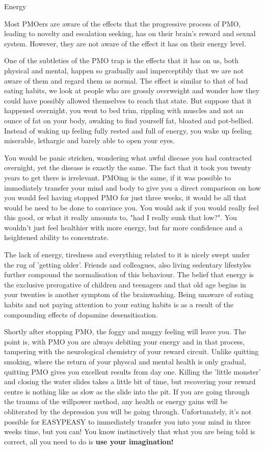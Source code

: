 Energy

Most PMOers are aware of the effects that the progressive process of PMO, leading to novelty and escalation seeking, has on their brain's reward and sexual system. However, they are not aware of the effect it has on their energy level.

One of the subtleties of the PMO trap is the effects that it has on us, both physical and mental, happen so gradually and imperceptibly that we are not aware of them and regard them as normal. The effect is similar to that of bad eating habits, we look at people who are grossly overweight and wonder how they could have possibly allowed themselves to reach that state. But suppose that it happened overnight, you went to bed trim, rippling with muscles and not an ounce of fat on your body, awaking to find yourself fat, bloated and pot-bellied. Instead of waking up feeling fully rested and full of energy, you wake up feeling miserable, lethargic and barely able to open your eyes.

You would be panic stricken, wondering what awful disease you had contracted overnight, yet the disease is exactly the same. The fact that it took you twenty years to get there is irrelevant. PMOing is the same, if it was possible to immediately transfer your mind and body to give you a direct comparison on how you would feel having stopped PMO for just three weeks, it would be all that would be need to be done to convince you. You would ask if you would really feel this good, or what it really amounts to, "had I really sunk that low?". You wouldn't just feel healthier with more energy, but far more confidence and a heightened ability to concentrate.

The lack of energy, tiredness and everything related to it is nicely swept under the rug of 'getting older'. Friends and colleagues, also living sedentary lifestyles further compound the normalisation of this behaviour. The belief that energy is the exclusive prerogative of children and teenagers and that old age begins in your twenties is another symptom of the brainwashing. Being unaware of eating habits and not paying attention to your eating habits is as a result of the compounding effects of dopamine desensitisation.

Shortly after stopping PMO, the foggy and muggy feeling will leave you. The point is, with PMO you are always debiting your energy and in that process, tampering with the neurological chemistry of your reward circuit. Unlike quitting smoking, where the return of your physcal and mental health is only gradual, quitting PMO gives you excellent results from day one. Killing the 'little monster' and closing the water slides takes a little bit of time, but recovering your reward centre is nothing like as slow as the slide into the pit. If you are going through the trauma of the willpower method, any health or energy gains will be obliterated by the depression you will be going through. Unfortunately, it's not possible for EASYPEASY to immediately transfer you into your mind in three weeks time, but you can! You know instinctively that what you are being told is correct, all you need to do is \textbf{use your imagination!}
